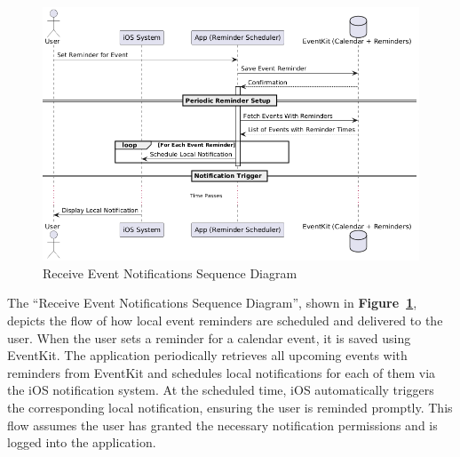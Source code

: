 \begin{figure}[!h]
  \centering
  \includegraphics[width=\textwidth]{images/docs/diagrams/sequence-diagrams/all-sequence-diagrams/Receive Event Notifications.png}
  \caption{Receive Event Notifications Sequence Diagram}
  \label{fig:seq/receive-event-notifications}
\end{figure}

The ``Receive Event Notifications Sequence Diagram'', shown in \textbf{Figure~\ref{fig:seq/receive-event-notifications}}, depicts the flow of how local event reminders are scheduled and delivered to the user. When the user sets a reminder for a calendar event, it is saved using EventKit. The application periodically retrieves all upcoming events with reminders from EventKit and schedules local notifications for each of them via the iOS notification system. At the scheduled time, iOS automatically triggers the corresponding local notification, ensuring the user is reminded promptly. This flow assumes the user has granted the necessary notification permissions and is logged into the application.

